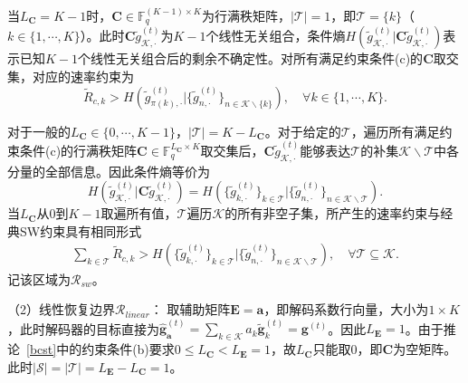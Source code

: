 当$L_{\mathbf{C}}=K-1$时，$\mathbf{C}\in\mathbb{F}_q^{(K-1)\times K}$为行满秩矩阵，$|\mathcal{T}|=1$，即$\mathcal{T}=\{k\}$（$k\in\{1,\cdots,K\}$）。此时$\mathbf{C}\tilde{g}_{\mathcal{K},\cdot}^{(t)}$为$K-1$个线性无关组合，条件熵$H(\tilde{g}_{\mathcal{K},\cdot}^{(t)}|\mathbf{C}\tilde{g}_{\mathcal{K},\cdot}^{(t)})$表示已知$K-1$个线性无关组合后的剩余不确定性。对所有满足约束条件(c)的$\mathbf{C}$取交集，对应的速率约束为
\begin{equation}
	\tilde{R}_{c,k}>H(\tilde{g}_{\pi(k),\cdot}^{(t)}|\{\tilde{g}_{n,\cdot}^{(t)}\}_{n\in\mathcal{K}\backslash\{k\}}),\quad\forall k\in\{1,\cdots,K\}.
\end{equation}

对于一般的$L_{\mathbf{C}}\in\{0,\cdots,K-1\}$，$|\mathcal{T}|=K-L_{\mathbf{C}}$。对于给定的$\mathcal{T}$，遍历所有满足约束条件(c)的行满秩矩阵$\mathbf{C}\in\mathbb{F}_q^{L_{\mathbf{C}}\times K}$取交集后，$\mathbf{C}\tilde{g}_{\mathcal{K},\cdot}^{(t)}$能够表达$\mathcal{T}$的补集$\mathcal{K}\backslash\mathcal{T}$中各分量的全部信息。因此条件熵等价为
\begin{equation}
	H(\tilde{g}_{\mathcal{K},\cdot}^{(t)}|\mathbf{C}\tilde{g}_{\mathcal{K},\cdot}^{(t)})=H(\{\tilde{g}_{k,\cdot}^{(t)}\}_{k\in\mathcal{T}}|\{\tilde{g}_{n,\cdot}^{(t)}\}_{n\in\mathcal{K}\backslash\mathcal{T}}).
\end{equation}
当$L_{\mathbf{C}}$从$0$到$K-1$取遍所有值，$\mathcal{T}$遍历$\mathcal{K}$的所有非空子集，所产生的速率约束与经典SW约束具有相同形式
\begin{align}
		\sum_{k\in\mathcal{T}}\tilde{R}_{c,k}>H\left(\{\tilde{g}_{k,\cdot}^{(t)}\}_{k\in\mathcal{T}}|\{\tilde{g}_{n,\cdot}^{(t)}\}_{n\in\mathcal{K}\backslash\mathcal{T}}\right),\quad\forall \mathcal{T}\subseteq \mathcal{K}.\label{sw-constraint}
\end{align}
记该区域为$\mathcal{R}_{sw}$。

（2）线性恢复边界$\mathcal{R}_{linear}$：
取辅助矩阵$\mathbf{E}=\mathbf{a}$，即解码系数行向量，大小为$1\times K$，此时解码器的目标直接为$\hat{\mathbf{g}}_{\mathbf{a}}^{(t)}=\sum_{k\in\mathcal{K}}a_k\tilde{\mathbf{g}}_k^{(t)}=\mathbf{g}^{(t)}$。因此$L_{\mathbf{E}}=1$。由于推论~\ref{bcst}中的约束条件(b)要求$0\leq L_{\mathbf{C}}<L_{\mathbf{E}}=1$，故$L_{\mathbf{C}}$只能取$0$，即$\mathbf{C}$为空矩阵。此时$|\mathcal{S}|=|\mathcal{T}|=L_{\mathbf{E}}-L_{\mathbf{C}}=1$。

